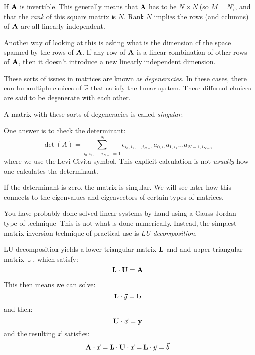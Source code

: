 \begin{answer}
If ${\bf A}$ is invertible. This generally means that ${\bf A}$ has to
be $N\times N$ (so $M=N$), and that the {\it rank} of this square
matrix is $N$. Rank $N$ implies the rows (and columns) of ${\bf A}$
are all linearly independent.

Another way of looking at this is asking what is the dimension of the
space spanned by the rows of ${\bf A}$. If any row of ${\bf A}$ is a
linear combination of other rows of ${\bf A}$, then it doesn't
introduce a new linearly independent dimension.

These sorts of issues in matrices are known as {\it degeneracies}. In
these cases, there can be multiple choices of $\vec{x}$ that satisfy
the linear system. These different choices are said to be degenerate
with each other.

A matrix with these sorts of degeneracies is called {\it singular}.
\end{answer}


\begin{answer}
  One answer is to check the determinant:
\begin{equation}
\label{eq:det}
\det(A) = \sum_{i_0, i_1, \ldots, i_{N-1} = 1}^{N} \epsilon_{i_0, i_1,
  \ldots, i_{N-1}} a_{0,i_0} a_{1,i_1} \ldots a_{{N-1}, i_{N-1}}
\end{equation}
where we use the Levi-Civita symbol. This explicit calculation is not
{\it usually} how one calculates the determinant.

If the determinant is zero, the matrix is singular. We will see later
how this connects to the eigenvalues and eigenvectors of certain types
of matrices.
\end{answer}

You have probably done solved linear systems by hand using a
Gauss-Jordan type of technique.  This is not what is done
numerically. Instead, the simplest matrix inversion technique of
practical use is {\it LU decomposition}.

LU decomposition yields a lower triangular matrix ${\bf L}$ and and
upper triangular matrix ${\bf U}$, which satisfy:
\begin{equation}
{\bf L} \cdot {\bf U} = {\bf A}
\end{equation}

This then means we can solve:
\begin{equation}
\label{eq:lyb}
{\bf L} \cdot \vec{y} = {\bf b}
\end{equation}
and then:
\begin{equation}
\label{eq:uxy}
{\bf U} \cdot \vec{x} = {\bf y}
\end{equation}
and the resulting $\vec{x}$ satisfies:
\begin{equation}
{\bf A} \cdot \vec{x} = {\bf L} \cdot {\bf U} \cdot \vec{x}  = {\bf L}
\cdot \vec{y} = \vec{b}
\end{equation}

